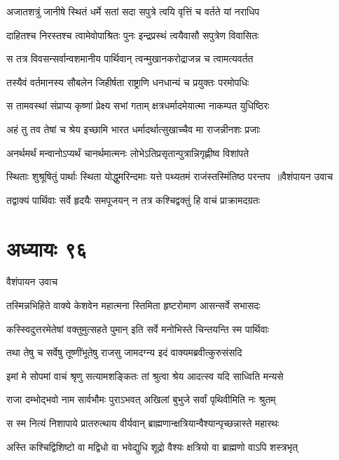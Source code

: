 \twolineshloka
{अजातशत्रुं जानीषे स्थितं धर्मे सतां सदा}
{सपुत्रे त्वयि वृत्तिं च वर्तते यां नराधिप}


\twolineshloka
{दाहितश्च निरस्तश्च त्वामेवोपाश्रितः पुनः}
{इन्द्रप्रस्थं त्वयैवासौ सपुत्रेण विवासितः}


\twolineshloka
{स तत्र विवसन्सर्वान्वशमानीय पार्थिवान्}
{त्वन्मुखानकरोद्राजन्न च त्वामत्यवर्तत}


\twolineshloka
{तस्यैवं वर्तमानस्य सौबलेन जिहीर्षता}
{राष्ट्राणि धनधान्यं च प्रयुक्तः परमोपधिः}


\twolineshloka
{स तामवस्थां संप्राप्य कृष्णां प्रेक्ष्य सभां गताम्}
{क्षत्रधर्मादमेयात्मा नाकम्पत युधिष्ठिरः}


\twolineshloka
{अहं तु तव तेषां च श्रेय इच्छामि भारत}
{धर्मादर्थात्सुखाच्चैव मा राजन्नीनशः प्रजाः}


\twolineshloka
{अनर्थमर्थं मन्वानोऽप्यर्थं चानर्थमात्मनः}
{लोभेऽतिप्रसृतान्पुत्रान्निगृह्णीष्व विशांपते}


\threelineshloka
{स्थिताः शुश्रूषितुं पार्थाः स्थिता योद्धुमरिन्दमाः}
{यत्ते पथ्यतमं राजंस्तस्मिंतिष्ठ परन्तप ॥वैशंपायन उवाच}
{}


\twolineshloka
{तद्वाक्यं पार्थिवाः सर्वे हृदयैः समपूजयन्}
{न तत्र कश्चिद्वक्तुं हि वाचं प्राक्रामदग्रतः}


\chapter{अध्यायः ९६}
\twolineshloka
{वैशंपायन उवाच}
{}


\twolineshloka
{तस्मिन्नभिहिते वाक्ये केशवेन महात्मना}
{स्तिमिता हृष्टरोमाण आसन्सर्वे सभासदः}


\twolineshloka
{कस्स्विदुत्तरमेतेषां वक्तुमुत्सहते पुमान्}
{इति सर्वे मनोभिस्ते चिन्तयन्ति स्म पार्थिवाः}


\twolineshloka
{तथा तेषु च सर्वेषु तूष्णींभूतेषु राजसु}
{जामदग्न्य इदं वाक्यमब्रवीत्कुरुसंसदि}


\twolineshloka
{इमां मे सोपमां वाचं श्रृणु सत्यामशङ्कितः}
{तां श्रुत्वा श्रेय आदत्स्व यदि साध्विति मन्यसे}


\twolineshloka
{राजा दम्भोद्भवो नाम सार्वभौमः पुराऽभवत्}
{अखिलां बुभुजे सर्वां पृथिवीमिति नः श्रुतम्}


\twolineshloka
{स स्म नित्यं निशापाये प्रातरुत्थाय वीर्यवान्}
{ब्राह्मणान्क्षत्रियान्वैश्यान्पृच्छन्नास्ते महारथः}


\twolineshloka
{अस्ति कश्चिद्विशिष्टो वा मद्विधो वा भवेद्युधि}
{शूद्रो वैश्यः क्षत्रियो वा ब्राह्मणो वाऽपि शस्त्रभृत्}


